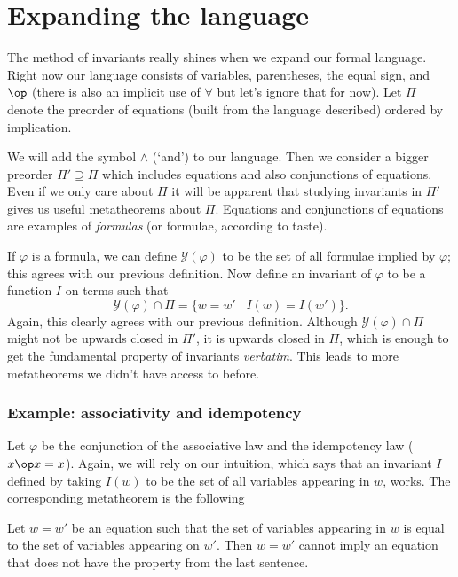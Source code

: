 \section{Expanding the language}
The method of invariants really shines when we expand our formal language. Right now our language consists of variables, parentheses, the equal sign, and $\op$ (there is also an implicit use of $\forall$ but let's ignore that for now).  Let $\Pi$ denote the preorder of equations (built from the language described) ordered by implication.

We will add the symbol $\wedge$ (`and') to our language. Then we consider a bigger preorder $\Pi' \supseteq \Pi$ which includes equations and also conjunctions of equations. Even if we only care about $\Pi$ it will be apparent that studying invariants in $\Pi'$ gives us useful metatheorems about $\Pi$. Equations and conjunctions of equations are examples of \emph{formulas} (or formulae, according to taste).

If $\varphi$ is a formula, we can define $\mathcal{Y}(\varphi)$ to be the set of all formulae implied by $\varphi$; this agrees with our previous definition. Now define an invariant of $\varphi$ to be a function $I$ on terms such that
\[
\mathcal{Y}(\varphi) \cap \Pi = \{w = w' \mid I(w) = I(w')\}.
\]
Again, this clearly agrees with our previous definition. Although $\mathcal{Y}(\varphi) \cap \Pi$ might not be upwards closed in $\Pi'$, it is upwards closed in $\Pi$, which is enough to get the fundamental property of invariants \emph{verbatim}. This leads to more metatheorems we didn't have access to before.

\subsubsection*{Example: associativity and idempotency}
Let $\varphi$ be the conjunction of the associative law and the idempotency law ($x \op x = x$). Again, we will rely on our intuition, which says that an invariant $I$ defined by taking $I(w)$ to be the set of all variables appearing in $w$, works. The corresponding metatheorem is the following

\begin{metatheorem}
	Let $w = w'$ be an equation such that the set of variables appearing in $w$ is equal to the set of variables appearing on $w'$. Then $w = w'$ cannot imply an equation that does not have the property from the last sentence.
\end{metatheorem}

